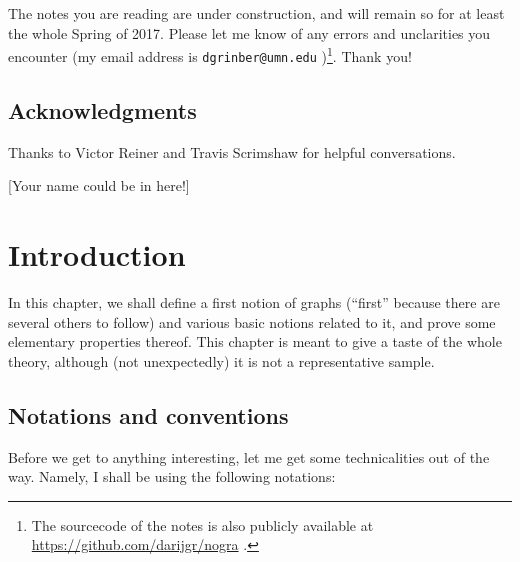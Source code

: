 \documentclass[numbers=enddot,12pt,final,onecolumn,notitlepage]{scrartcl}%
\theoremstyle{definition}
\begin{document}
The notes you are reading are under construction, and will remain so for at
least the whole Spring of 2017. Please let me know of any errors and
unclarities you encounter (my email address is \texttt{dgrinber@umn.edu}%
)\footnote{The sourcecode of the notes is also publicly available at
\url{https://github.com/darijgr/nogra} .}. Thank you!

\subsection{Acknowledgments}

Thanks to Victor Reiner and Travis Scrimshaw for helpful
conversations.

[Your name could be in here!]

\section{\label{chp.intro}Introduction}

In this chapter, we shall define a first notion of graphs (``first''
because there are several others to follow) and various basic notions
related to it, and prove some elementary properties thereof. This
chapter is meant to give a taste of the whole theory, although (not
unexpectedly) it is not a representative sample.

\subsection{\label{sect.intro.notations}Notations and conventions}

Before we get to anything interesting, let me get some technicalities
out of the way. Namely, I shall be using the following notations:
\end{document}
